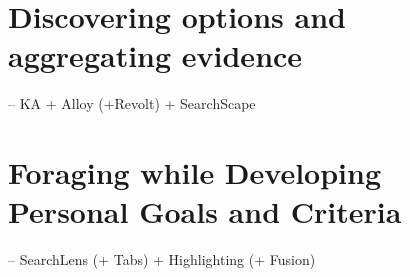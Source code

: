 \section{Discovering options and aggregating evidence}
    -- KA + Alloy (+Revolt) + SearchScape
    
\section{Foraging while Developing Personal Goals and Criteria}
    -- SearchLens (+ Tabs) + Highlighting (+ Fusion)
